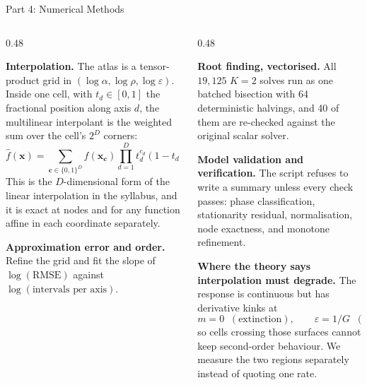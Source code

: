 \documentclass[aspectratio=169,10pt]{beamer}
\begin{document}
\begin{frame}{Part 4: Numerical Methods}

\footnotesize
\begin{columns}[T,onlytextwidth]
\begin{column}{0.48\textwidth}

\textbf{Interpolation.}
The atlas is a tensor-product grid in $(\log\alpha,\log\rho,\log\varepsilon)$.
Inside one cell, with $t_d\in[0,1]$ the fractional position along axis $d$, the
\alert{multilinear} interpolant is the weighted sum over the cell's $2^D$ corners:
\[
  \hat f(\mathbf x)=\sum_{\mathbf c\in\{0,1\}^D}
      f(\mathbf x_{\mathbf c})\prod_{d=1}^{D}t_d^{c_d}(1-t_d)^{1-c_d}.
\]
This is the $D$-dimensional form of the linear interpolation in the syllabus, and
it is exact at nodes and for any function affine in each coordinate separately.

\medskip
\textbf{Approximation error and order.}
Refine the grid and fit the slope of $\log(\text{RMSE})$ against
$\log(\text{intervals per axis})$.

\end{column}
\begin{column}{0.48\textwidth}

\textbf{Root finding, vectorised.}
All $19{,}125$ $K=2$ solves run as one batched bisection with 64 deterministic
halvings, and 40 of them are re-checked against the original scalar solver.

\medskip
\textbf{Model validation and verification.}
The script refuses to write a summary unless every check passes:
phase classification, stationarity residual, normalisation, node exactness, and
monotone refinement.

\medskip
\textbf{Where the theory says interpolation must degrade.}
The response is continuous but has derivative kinks at
\[
  m=0 \;\;(\text{extinction}),
  \qquad
  \varepsilon=1/G \;\;(\text{clip activates}),
\]
so cells crossing those surfaces cannot keep second-order behaviour. We measure
the two regions separately instead of quoting one rate.

\end{column}
\end{columns}
\end{frame}
\end{document}
